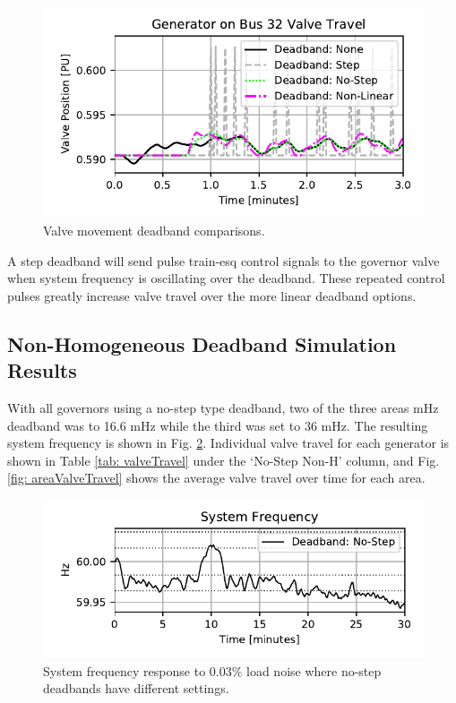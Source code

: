 \begin{figure}[!ht]
\centering
\includegraphics[width=\linewidth]{figures/gen32ValveComp}
\caption{Valve movement deadband comparisons.}
\label{fig: valveComp}
\end{figure}

A step deadband will send pulse train-esq control signals to the governor valve when system frequency is oscillating over the deadband. 
These repeated control pulses greatly increase valve travel over the more linear deadband options.


\subsection{Non-Homogeneous Deadband Simulation Results}
With all governors using a no-step type deadband, two of the three areas mHz deadband was to 16.6 mHz while the third was set to 36 mHz.
The resulting system frequency is shown in Fig. \ref{fig: uniFreq}.
Individual valve travel for each generator is shown in {Table \ref{tab: valveTravel}} under the `No-Step Non-H' column, and Fig. \ref{fig: areaValveTravel} shows the average valve travel over time for each area.

\begin{figure}[!ht]
\centering
\includegraphics[width=\linewidth]{figures/miniWECCuniAccFreq}
\caption{System frequency response to 0.03\% load noise where no-step deadbands have different settings.}
\label{fig: uniFreq}
\end{figure}

